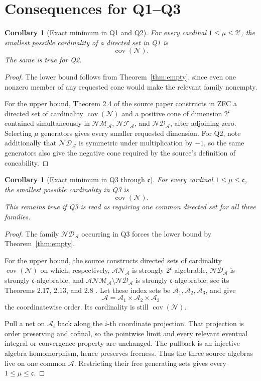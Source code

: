 \documentclass[11pt]{article}
\newtheorem{corollary}[theorem]{Corollary}
\theoremstyle{remark}
\newcommand{\covN}{\operatorname{cov}(\mathcal N)}
\newcommand{\cNM}{\mathcal{NM}}
\newcommand{\cNF}{\mathcal{NF}}
\newcommand{\cND}{\mathcal{ND}}
\newcommand{\cAN}{\mathcal{AN}}
\newcommand{\cANM}{\mathcal{ANM}}
\newcommand{\finc}{\mathfrak c}
\begin{document}
\section{Consequences for Q1--Q3}

\begin{corollary}[Exact minimum in Q1 and Q2]
\label{cor:q12}
For every cardinal \(1\le\mu\le2^{\finc}\), the smallest possible
cardinality of a directed set in Q1 is
\[
                         \boxed{\covN}.
\]
The same is true for Q2.
\end{corollary}

\begin{proof}
The lower bound follows from Theorem~\ref{thm:empty}, since even one nonzero
member of any requested cone would make the relevant family nonempty.

For the upper bound, Theorem 2.4 of the source paper \cite{source} constructs
in ZFC a directed set of cardinality \(\covN\) and a positive cone of
dimension \(2^{\finc}\) contained simultaneously in
\(\cNM_{\mathcal A}\), \(\cNF_{\mathcal A}\), and
\(\cND_{\mathcal A}\), after adjoining zero.  Selecting \(\mu\) generators
gives every smaller requested dimension.  For Q2, note additionally that
\(\cND_{\mathcal A}\) is symmetric under multiplication by \(-1\), so the
same generators also give the negative cone required by the source's
definition of coneability.
\end{proof}

\begin{corollary}[Exact minimum in Q3 through \(\finc\)]
\label{cor:q3}
For every cardinal \(1\le\mu\le\finc\), the smallest possible cardinality
in Q3 is
\[
                         \boxed{\covN}.
\]
This remains true if Q3 is read as requiring one common directed set for all
three families.
\end{corollary}

\begin{proof}
The family \(\cND_{\mathcal A}\) occurring in Q3 forces the lower bound by
Theorem~\ref{thm:empty}.

For the upper bound, the source constructs directed sets of cardinality
\(\covN\) on which, respectively,
\(\cAN_{\mathcal A}\) is strongly \(2^{\finc}\)-algebrable,
\(\cND_{\mathcal A}\) is strongly \(\finc\)-algebrable, and
\(\cANM_{\mathcal A}\setminus\cND_{\mathcal A}\) is strongly
\(\finc\)-algebrable; see its Theorems 2.17, 2.13, and 2.8
\cite{source}.  Let these index sets be
\(\mathcal A_1,\mathcal A_2,\mathcal A_3\), and give
\[
              \mathcal A
              =\mathcal A_1\times\mathcal A_2\times\mathcal A_3
\]
the coordinatewise order.  Its cardinality is still \(\covN\).

Pull a net on \(\mathcal A_i\) back along the \(i\)-th coordinate
projection.  That projection is order preserving and cofinal, so the
pointwise limit and every relevant eventual integral or convergence
property are unchanged.  The pullback is an injective algebra
homomorphism, hence preserves freeness.  Thus the three source algebras live
on one common \(\mathcal A\).  Restricting their free generating sets gives
every \(1\le\mu\le\finc\).
\end{proof}
\end{document}
